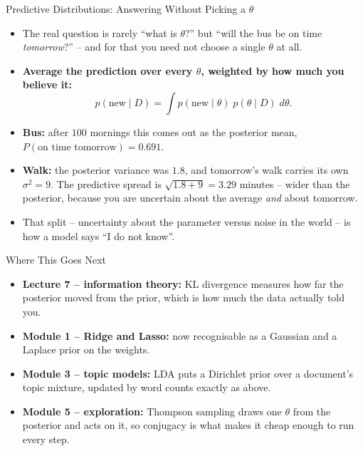 \begin{frame}{Predictive Distributions: Answering Without Picking a $\theta$}
\begin{itemize}
  \item The real question is rarely ``what is $\theta$?'' but ``will the bus be on time \emph{tomorrow}?'' -- and for that you need not choose a single $\theta$ at all.
  \pause
  \item \textbf{Average the prediction over every $\theta$, weighted by how much you believe it:}
  \[
    p(\text{new} \mid D) = \int p(\text{new} \mid \theta)\; p(\theta \mid D)\; d\theta .
  \]
  \pause
  \item \textbf{Bus:} after $100$ mornings this comes out as the posterior mean, $P(\text{on time tomorrow}) = 0.691$.
  \pause
  \item \textbf{Walk:} the posterior variance was $1.8$, and tomorrow's walk carries its own $\sigma^2 = 9$. The predictive spread is $\sqrt{1.8 + 9} = 3.29$ minutes -- wider than the posterior, because you are uncertain about the average \emph{and} about tomorrow.
  \pause
  \item That split -- uncertainty about the parameter versus noise in the world -- is how a model says ``I do not know''.
\end{itemize}
\end{frame}

\begin{frame}{Where This Goes Next}
\begin{itemize}
  \item \textbf{Lecture 7 -- information theory:} KL divergence measures how far the posterior moved from the prior, which is how much the data actually told you.
  \pause
  \item \textbf{Module 1 -- Ridge and Lasso:} now recognisable as a Gaussian and a Laplace prior on the weights.
  \pause
  \item \textbf{Module 3 -- topic models:} LDA puts a Dirichlet prior over a document's topic mixture, updated by word counts exactly as above.
  \pause
  \item \textbf{Module 5 -- exploration:} Thompson sampling draws one $\theta$ from the posterior and acts on it, so conjugacy is what makes it cheap enough to run every step.
\end{itemize}
\end{frame}

